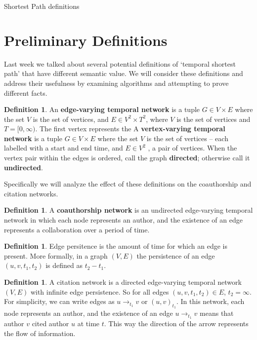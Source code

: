 \documentclass{article}
\theoremstyle{definition}
\newtheorem{defn}[thm]{Definition}
\numberwithin{thm}{subsection}
\begin{document}
\begin{center} \Large Shortest Path definitions\end{center}

\section{Preliminary Definitions}

Last week we talked about several potential definitions of `temporal shortest
path' that have different semantic value. We will consider these definitions
and address their usefulness by examining algorithms and attempting to prove
different facts.

\begin{defn}
  An \textbf{edge-varying temporal network} is a tuple $G \in V \times E$ where
  the set $V$ is the set of vertices, and $E \in V^2 \times T^2$, where $V$ is
  the set of vertices and $T = [0,\infty)$.  The first vertex represents the
  A \textbf{vertex-varying temporal network} is a tuple $G \in V \times E$ where
  the set $V$ is the set of vertices -- each labelled with a start and end time,
  and $E \in V^2$ , a pair of vertices.
  When the vertex pair within the edges is ordered, call the graph
  \textbf{directed}; otherwise call it \textbf{undirected}.
\end{defn}

Specifically we will analyze the effect of these definitions on the coauthorship
and citation networks.


\begin{defn}
  A \textbf{coauthorship network} is an undirected edge-varying temporal network
  in which each node represents an author, and the existence of an edge represents
  a collaboration over a period of time.
\end{defn}

\begin{defn}
  Edge persitence is the amount of time for which an edge is present. More
  formally, in a graph $(V,E)$ the persistence of an edge $(u,v,t_1,t_2)$ is
  defined as $t_2 - t_1$.
\end{defn}

\begin{defn}
  A citation network is a directed edge-varying temporal network $(V,E)$ with
  infinite edge persistence. So for all edges $(u,v,t_1,t_2)\in E$,
  $t_2 = \infty$. For simplicity, we can write edges as $u \to_{t_1} v$ or
  $(u,v)_{t_1}$.  In this network, each node represents an author, and the
  existence of an edge $u \to_{t_1} v$ means that author $v$ cited author $u$
  at time $t$. This way the direction of the arrow represents the flow of
  information.
\end{defn}
\end{document}
